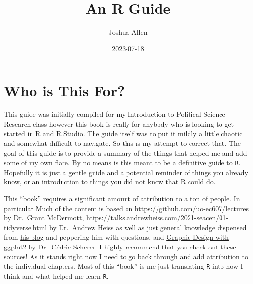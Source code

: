 \documentclass[
  letterpaper,
  DIV=11,
  numbers=noendperiod,
  oneside]{scrreprt}
\title{An R Guide}
\author{Joshua Allen}
\date{2023-07-18}
\renewcommand*\contentsname{Table of contents}
\newcommand\contentsname{Table of contents}
\begin{document}
\maketitle
\ifdefined\Shaded\renewenvironment{Shaded}{\begin{tcolorbox}[enhanced, breakable, sharp corners, interior hidden, boxrule=0pt, borderline west={3pt}{0pt}{shadecolor}, frame hidden]}{\end{tcolorbox}}\fi

\renewcommand*\contentsname{Table of contents}
{
\hypersetup{linkcolor=}
\setcounter{tocdepth}{2}
\tableofcontents
}

\hypertarget{who-is-this-for}{%
\chapter*{Who is This For?}\label{who-is-this-for}}


This guide was initially compiled for my Introduction to Political
Science Research class however this book is really for anybody who is
looking to get started in R and R Studio. The guide itself was to put it
mildly a little chaotic and somewhat difficult to navigate. So this is
my attempt to correct that. The goal of this guide is to provide a
summary of the things that helped me and add some of my own flare. By no
means is this meant to be a definitive guide to \texttt{R}. Hopefully it
is just a gentle guide and a potential reminder of things you already
know, or an introduction to things you did not know that R could do.

This ``book'' requires a significant amount of attribution to a ton of
people. In particular Much of the content is based on
\url{https://github.com/uo-ec607/lectures} by Dr.~Grant McDermott,
\url{https://talks.andrewheiss.com/2021-seacen/01-tidyverse.html} by
Dr.~Andrew Heiss as well as just general knowledge dispensed from
\href{https://www.andrewheiss.com/blog/}{his blog} and peppering him
with questions, and
\href{https://rstudio-conf-2022.github.io/ggplot2-graphic-design/}{Graphic
Design with ggplot2} by Dr.~Cédric Scherer. I highly recommend that you
check out these sources! As it stands right now I need to go back
through and add attribution to the individual chapters. Most of this
``book'' is me just translating \texttt{R} into how I think and what
helped me learn \texttt{R}.
\end{document}
